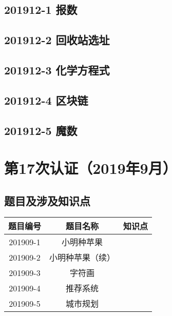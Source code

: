 \documentclass[cn,10pt,math=newtx,citestyle=gb7714-2015,bibstyle=gb7714-2015]{elegantbook}
\newif\ifonlyanalyze %
\begin{document}
\newpage
\section{201912-1 报数}
\ifonlyanalyze
\else
    
\fi


\newpage
\section{201912-2 回收站选址}
\ifonlyanalyze
\else
    
\fi


\newpage
\section{201912-3 化学方程式}
\ifonlyanalyze
\else
    
\fi


\newpage
\section{201912-4 区块链}
\ifonlyanalyze
\else
    
\fi


\newpage
\section{201912-5 魔数}
\ifonlyanalyze
\else
    
\fi



\chapter{第17次认证（2019年9月）}

\section{题目及涉及知识点}

\begin{table}[htbp]
    \centering
    \begin{tabular}{ccc}
        \toprule
        题目编号 & 题目名称         & 知识点 \\
        \midrule
        201909-1 & 小明种苹果       &        \\
        201909-2 & 小明种苹果（续） &        \\
        201909-3 & 字符画           &        \\
        201909-4 & 推荐系统         &        \\
        201909-5 & 城市规划         &        \\
        \bottomrule
    \end{tabular}
\end{table}
\end{document}
